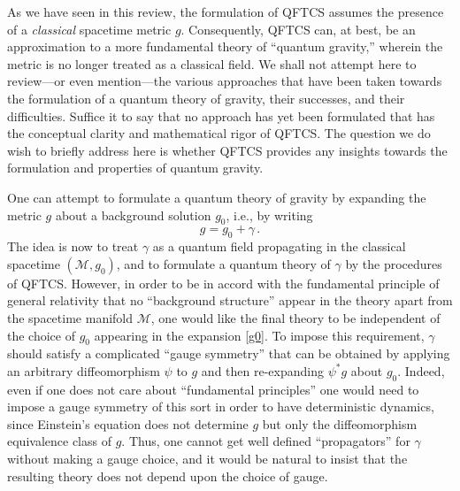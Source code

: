 \documentclass[12pt]{article}
\newcommand{\M}{\mathscr{M}}
\theoremstyle{plain}
\theoremstyle{definition}
\def\ben{\begin{equation}}
\def\een{\end{equation}}
\begin{document}
As we have seen in this review, the formulation of QFTCS assumes the presence of
a {\it classical} spacetime metric $g$. Consequently, QFTCS can, at best, be an approximation to a more fundamental
theory of ``quantum gravity,'' wherein the metric is no longer treated as a classical field. We shall not attempt here to review---or even mention---the various approaches that have been taken towards the formulation
of a quantum theory
of gravity, their successes, and their difficulties. Suffice it to say that no approach has yet been formulated that has
the conceptual clarity and mathematical rigor of QFTCS. The question we do wish to briefly address here is whether QFTCS
provides any insights towards the formulation and properties of quantum gravity.

One can attempt to formulate a quantum theory of gravity by expanding the metric $g$ about a background
solution $g_0$, i.e., by writing
\ben
g = g_0 + \gamma \, .
\label{g0}
\een
The idea is now to treat $\gamma$ as a quantum field propagating in the classical spacetime $(\M, g_0)$, and to formulate a quantum theory of $\gamma$ by the procedures of QFTCS. However, in order to be in accord with
the fundamental principle of general relativity that no ``background structure'' appear in the theory apart from the spacetime manifold $\M$, one would like the final theory to be independent of the choice of $g_0$ appearing in the
expansion \eqref{g0}. To impose this requirement, $\gamma$ should satisfy a complicated ``gauge symmetry'' that can be obtained by applying an arbitrary diffeomorphism $\psi$ to $g$ and then re-expanding $\psi^* g$ about $g_0$. Indeed, even
if one does not care about ``fundamental principles'' one would need to impose a gauge symmetry of this sort
in order to have deterministic dynamics, since Einstein's equation does not determine $g$ but only the diffeomorphism
equivalence class of $g$. Thus, one cannot get well defined ``propagators'' for $\gamma$ without making a gauge
choice, and it would be natural to insist that the resulting theory does not depend upon the choice of gauge.
\end{document}

